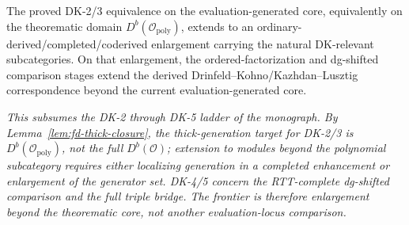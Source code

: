 \begin{conjecture}
\label{conj:master-dk-kl}
\ClaimStatusConjectured{}
The proved DK-2/3 equivalence on the evaluation-generated core,
equivalently on the theorematic domain
$D^b(\mathcal{O}_{\mathrm{poly}})$, extends to an
ordinary-derived/completed/coderived enlargement carrying the natural
DK-relevant subcategories.  On that enlargement, the ordered-factorization
and dg-shifted comparison stages extend the derived
Drinfeld--Kohno/Kazhdan--Lusztig correspondence beyond the current
evaluation-generated core.

\emph{This subsumes the DK-2 through DK-5 ladder of the monograph.
By Lemma~\textup{\ref{lem:fd-thick-closure}}, the thick-generation
target for DK-2/3 is $D^b(\mathcal{O}_{\mathrm{poly}})$, not the
full $D^b(\mathcal{O})$; extension to modules beyond the polynomial
subcategory requires either localizing generation in a completed
enhancement or enlargement of the generator set.  DK-4/5 concern the
RTT-complete dg-shifted comparison and the full triple bridge.  The
frontier is therefore enlargement beyond the theorematic core, not
another evaluation-locus comparison.}
\end{conjecture}

